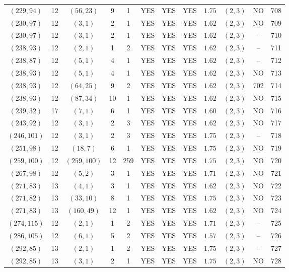 \begin{longtable}{|c|c|c|c|c|c|c|c|c|c|c|c|}
$(229,94)$ & 12 & $(56,23)$ & 9 & 1 & YES & YES & YES & $1.75$ & $(2,3)$ & NO & 708\\
$(230,97)$ & 12 & $(3,1)$ & 2 & 1 & YES & YES & YES & $1.62$ & $(2,3)$ & NO & 709\\
$(230,97)$ & 12 & $(3,1)$ & 2 & 1 & YES & YES & YES & $1.62$ & $(2,3)$ & -- & 710\\
$(238,93)$ & 12 & $(2,1)$ & 1 & 2 & YES & YES & YES & $1.62$ & $(2,3)$ & -- & 711\\
$(238,87)$ & 12 & $(5,1)$ & 4 & 1 & YES & YES & YES & $1.62$ & $(2,3)$ & -- & 712\\
$(238,93)$ & 12 & $(5,1)$ & 4 & 1 & YES & YES & YES & $1.62$ & $(2,3)$ & NO & 713\\
$(238,93)$ & 12 & $(64,25)$ & 9 & 2 & YES & YES & YES & $1.62$ & $(2,3)$ & 702 & 714\\
$(238,93)$ & 12 & $(87,34)$ & 10 & 1 & YES & YES & YES & $1.62$ & $(2,3)$ & NO & 715\\
$(239,32)$ & 17 & $(7,1)$ & 6 & 1 & YES & YES & YES & $1.60$ & $(2,3)$ & NO & 716\\
$(243,92)$ & 12 & $(3,1)$ & 2 & 3 & YES & YES & YES & $1.62$ & $(2,3)$ & NO & 717\\
$(246,101)$ & 12 & $(3,1)$ & 2 & 3 & YES & YES & YES & $1.75$ & $(2,3)$ & -- & 718\\
$(251,98)$ & 12 & $(18,7)$ & 6 & 1 & YES & YES & YES & $1.75$ & $(2,3)$ & NO & 719\\
$(259,100)$ & 12 & $(259,100)$ & 12 & 259 & YES & YES & YES & $1.75$ & $(2,3)$ & NO & 720\\
$(267,98)$ & 12 & $(5,2)$ & 3 & 1 & YES & YES & YES & $1.71$ & $(2,3)$ & NO & 721\\
$(271,83)$ & 13 & $(4,1)$ & 3 & 1 & YES & YES & YES & $1.62$ & $(2,3)$ & NO & 722\\
$(271,82)$ & 13 & $(33,10)$ & 8 & 1 & YES & YES & YES & $1.75$ & $(2,3)$ & NO & 723\\
$(271,83)$ & 13 & $(160,49)$ & 12 & 1 & YES & YES & YES & $1.62$ & $(2,3)$ & NO & 724\\
$(274,115)$ & 12 & $(2,1)$ & 1 & 2 & YES & YES & YES & $1.71$ & $(2,3)$ & -- & 725\\
$(286,105)$ & 12 & $(6,1)$ & 5 & 2 & YES & YES & YES & $1.57$ & $(2,3)$ & -- & 726\\
$(292,85)$ & 13 & $(2,1)$ & 1 & 2 & YES & YES & YES & $1.75$ & $(2,3)$ & -- & 727\\
$(292,85)$ & 13 & $(3,1)$ & 2 & 1 & YES & YES & YES & $1.75$ & $(2,3)$ & NO & 728\\

\end{longtable}
